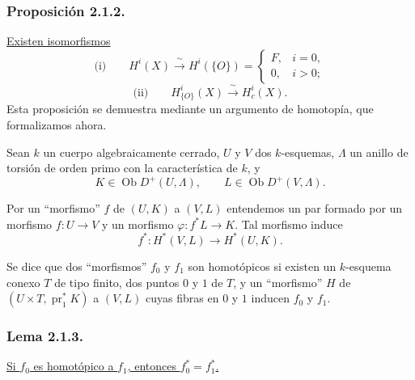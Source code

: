 \subsubsection*{Proposición 2.1.2.}
\underline{Existen isomorfismos}
\[
\text{(i)}\qquad
H^i(X)\xrightarrow{\ \sim\ }H^i(\{O\})=
\begin{cases}
F,& i=0,\\
0,& i>0;
\end{cases}
\]
\[
\text{(ii)}\qquad
H^i_{\{O\}}(X)\xrightarrow{\ \sim\ }H^i_c(X).
\]
Esta proposición se demuestra mediante un argumento de homotopía, que
formalizamos ahora.

Sean $k$ un cuerpo algebraicamente cerrado, $U$ y $V$ dos $k$-esquemas,
$\Lambda$ un anillo de torsión de orden primo con la característica de
$k$, y
\[
K\in\operatorname{Ob}D^+(U,\Lambda),
\qquad L\in\operatorname{Ob}D^+(V,\Lambda).
\]

\pageoriginale

Por un ``morfismo'' $f$ de $(U,K)$ a $(V,L)$ entendemos un par formado
por un morfismo $f:U\to V$ y un morfismo $\varphi:f^*L\to K$. Tal
morfismo induce
\[
f^*:H^*(V,L)\longrightarrow H^*(U,K).
\]

Se dice que dos ``morfismos'' $f_0$ y $f_1$ son homotópicos si existen
un $k$-esquema conexo $T$ de tipo finito, dos puntos $0$ y $1$ de $T$,
y un ``morfismo'' $H$ de $(U\times T,\operatorname{pr}_1^*K)$ a
$(V,L)$ cuyas fibras en $0$ y $1$ inducen $f_0$ y $f_1$.

\subsubsection*{Lema 2.1.3.}
\underline{Si $f_0$ es homotópico a $f_1$, entonces
$f_0^*=f_1^*$.}

